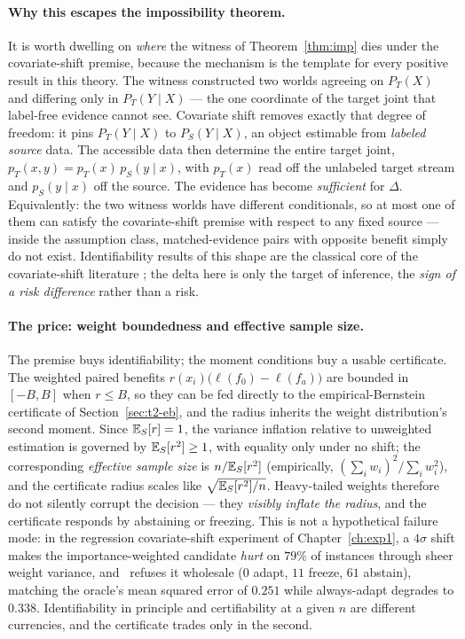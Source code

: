 \paragraph{Why this escapes the impossibility theorem.}
It is worth dwelling on \emph{where} the witness of Theorem~\ref{thm:imp} dies under
the covariate-shift premise, because the mechanism is the template for every positive
result in this theory. The witness constructed two worlds agreeing on $P_T(X)$ and
differing only in $P_T(Y\mid X)$ --- the one coordinate of the target joint that
label-free evidence cannot see. Covariate shift removes exactly that degree of freedom:
it pins $P_T(Y\mid X)$ to $P_S(Y\mid X)$, an object estimable from \emph{labeled
source} data. The accessible data then determine the entire target joint,
$p_T(x,y)=p_T(x)\,p_S(y\mid x)$, with $p_T(x)$ read off the unlabeled target stream and
$p_S(y\mid x)$ off the source. The evidence has become \emph{sufficient} for $\Delta$.
Equivalently: the two witness worlds have different conditionals, so at most one of
them can satisfy the covariate-shift premise with respect to any fixed source ---
inside the assumption class, matched-evidence pairs with opposite benefit simply do not
exist. Identifiability results of this shape are the classical core of the
covariate-shift literature \cite{shimodaira2000improving,sugiyama2007covariate,
quinonero2009dataset}; the delta here is only the target of inference, the \emph{sign
of a risk difference} rather than a risk.

\paragraph{The price: weight boundedness and effective sample size.}
The premise buys identifiability; the moment conditions buy a usable certificate. The
weighted paired benefits $r(x_i)\bigl(\ell(f_0)-\ell(f_a)\bigr)$ are bounded in
$[-B,B]$ when $r\le B$, so they can be fed directly to the empirical-Bernstein
certificate of Section~\ref{sec:t2-eb}, and the radius inherits the weight
distribution's second moment. Since $\mathbb{E}_S[r]=1$, the variance inflation relative to
unweighted estimation is governed by $\mathbb{E}_S[r^2]\ge1$, with equality only under no
shift; the corresponding \emph{effective sample size} is $n/\mathbb{E}_S[r^2]$ (empirically,
$(\sum_iw_i)^2/\sum_iw_i^2$), and the certificate radius scales like
$\sqrt{\mathbb{E}_S[r^2]/n}$. Heavy-tailed weights therefore do not silently corrupt the
decision --- they \emph{visibly inflate the radius}, and the certificate responds by
abstaining or freezing. This is not a hypothetical failure mode: in the regression
covariate-shift experiment of Chapter~\ref{ch:exp1}, a $4\sigma$ shift makes the
importance-weighted candidate \emph{hurt} on $79\%$ of instances through sheer weight
variance, and \KGA\ refuses it wholesale ($0$ adapt, $11$ freeze, $61$ abstain),
matching the oracle's mean squared error of $0.251$ while always-adapt degrades to
$0.338$. Identifiability in principle and certifiability at a given $n$ are different
currencies, and the certificate trades only in the second.

